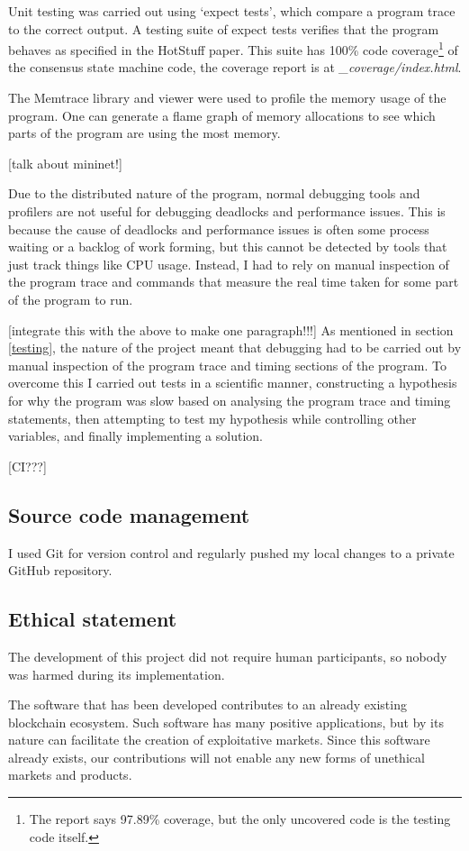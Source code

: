 Unit testing was carried out using `expect tests', which compare a program trace to the correct output. A testing suite of expect tests verifies that the program behaves as specified in the HotStuff paper. This suite has 100\% code coverage\footnote{The report says 97.89\% coverage, but the only uncovered code is the testing code itself.} of the consensus state machine code, the coverage report is at \textit{\_coverage/index.html}.

The Memtrace library and viewer \cite{noauthor_memtrace_nodate} were used to profile the memory usage of the program. One can generate a flame graph of memory allocations to see which parts of the program are using the most memory.

[talk about mininet!] \cite{noauthor_mininet_nodate}

Due to the distributed nature of the program, normal debugging tools and profilers are not useful for debugging deadlocks and performance issues. This is because the cause of deadlocks and performance issues is often some process waiting or a backlog of work forming, but this cannot be detected by tools that just track things like CPU usage. Instead, I had to rely on manual inspection of the program trace and commands that measure the real time taken for some part of the program to run.

[integrate this with the above to make one paragraph!!!]
As mentioned in section \ref{testing}, the nature of the project meant that debugging had to be carried out by manual inspection of the program trace and timing sections of the program. To overcome this I carried out tests in a scientific manner, constructing a hypothesis for why the program was slow based on analysing the program trace and timing statements, then attempting to test my hypothesis while controlling other variables, and finally implementing a solution.

[CI???]

\subsection{Source code management}

I used Git for version control and regularly pushed my local changes to a private GitHub repository.

\subsection{Ethical statement}
The development of this project did not require human participants, so nobody was harmed during its implementation.

The software that has been developed contributes to an already existing blockchain ecosystem. Such software has many positive applications, but by its nature can facilitate the creation of exploitative markets. Since this software already exists, our contributions will not enable any new forms of unethical markets and products.
